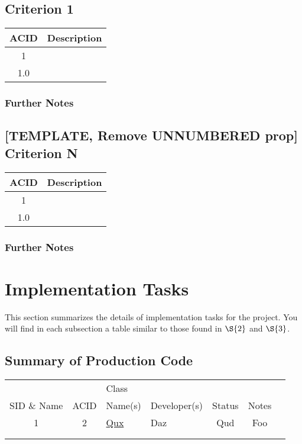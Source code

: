 \documentclass[11pt]{article}
\begin{document}
\subsection{Criterion 1}
\label{sec:org8bff951}
\begin{center}
\begin{tabular}{|c|l|}
ACID & Description\\
\hline
1 & \\
\hline
1.0 & \\
\end{tabular}
\end{center}

\subsubsection*{Further Notes}
\label{sec:orgd5c39a9}
\subsection*{[TEMPLATE, Remove UNNUMBERED prop] Criterion N}
\label{sec:org819948a}
\begin{center}
\begin{tabular}{|c|l|}
ACID & Description\\
\hline
1 & \\
\hline
1.0 & \\
\end{tabular}
\end{center}

\subsubsection*{Further Notes}
\label{sec:org71fa4ca}
\section{Implementation Tasks}
\label{sec:org27e0ede}
This section summarizes the details of implementation tasks for the project. You will find in each
subsection a table similar to those found in \hyperref[sec:orgb72f50b]{\(\S{2}\)} and \hyperref[sec:orgd8c15f3]{\(\S{3}\)}.

\subsection{Summary of Production Code}
\label{sec:orgfacb6b9}

\begin{center}
\begin{tabular}{|c|c|p{3.5cm}|p{3.5cm}|c|c|c|}
 &  & Class &  &  & \\
SID \& Name & ACID & Name(s) & Developer(s) & Status & Notes\\
\hline
1 & 2 & \hyperref[sec:orgf606299]{Qux} & Daz & Qud & Foo\\
\hline
 &  &  &  &  & \\
\hline
 &  &  &  &  & \\
\end{tabular}
\end{center}
\end{document}
